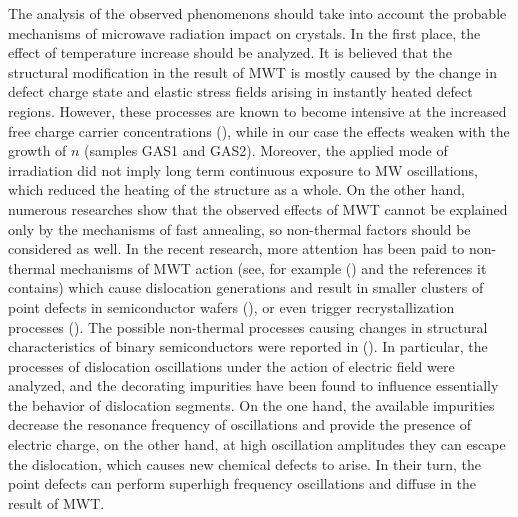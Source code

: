 \documentclass[final,3p,times,twocolumn,authoryear]{elsarticle}
\begin{document}
The analysis of the observed phenomenons should take into account
the probable mechanisms of microwave radiation impact on crystals.
In the first place, the effect of temperature increase should be analyzed.
It is believed that the structural modification in the result of MWT  is mostly caused by the change
in defect charge state and elastic stress fields arising in instantly heated defect regions.
However, these processes are known to become intensive at the increased free charge carrier concentrations (\cite{MW:Rev}),
while in our case the effects weaken with the growth of $n$ (samples GAS1 and GAS2).
Moreover, the applied mode of irradiation did not imply long term continuous exposure to MW oscillations,
which reduced the heating of the structure as a whole.
On the other hand, numerous researches show that the observed effects of MWT cannot be explained only by the mechanisms of fast  annealing,
so non-thermal factors should be considered as well.
In the recent research, more attention has been paid to non-thermal mechanisms of MWT action
(see, for example (\cite{MW:Si2018}) and the references it contains)
which cause dislocation generations and result in smaller  clusters of point defects in semiconductor wafers (\cite{Konakova2007JTFEn}),
or even trigger recrystallization processes (\cite{MW:Si2018}).
The possible non-thermal processes causing changes in structural characteristics of binary semiconductors were reported in (\cite{Konakova2007JTFEn}).
In particular, the processes of dislocation oscillations under the action of electric field were analyzed,
and the decorating impurities have been found to influence essentially the behavior of dislocation segments.
On the one hand, the available impurities decrease the resonance frequency of oscillations
and provide the presence of electric charge,
on the other hand, at high oscillation amplitudes they can escape the dislocation,
which causes new chemical defects to arise.
In their turn, the point defects can perform superhigh frequency oscillations and diffuse in the result of MWT.
\end{document}
